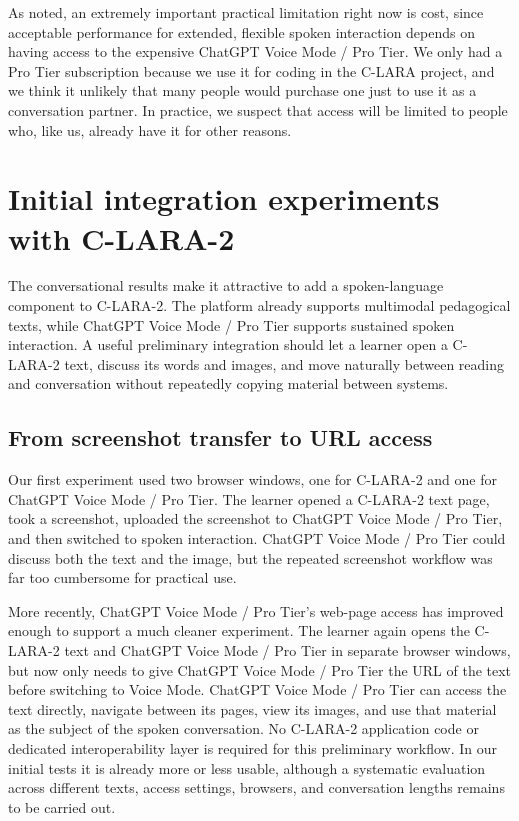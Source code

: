 \documentclass[11pt,a4paper]{article}
\begin{document}
As noted, an extremely important practical limitation right now is cost, since acceptable performance for extended, flexible spoken interaction depends on having access to the expensive ChatGPT Voice Mode / Pro Tier. We only had a Pro Tier subscription because we use it for coding in the C-LARA project, and we think it unlikely that many people would purchase one just to use it as a conversation partner. In practice, we suspect that access will be limited to people who, like us, already have it for other reasons.

\section{Initial integration experiments with C-LARA-2}

The conversational results make it attractive to add a spoken-language component to C-LARA-2. The platform already supports multimodal pedagogical texts, while ChatGPT Voice Mode / Pro Tier supports sustained spoken interaction. A useful preliminary integration should let a learner open a C-LARA-2 text, discuss its words and images, and move naturally between reading and conversation without repeatedly copying material between systems.

\subsection{From screenshot transfer to URL access}

Our first experiment used two browser windows, one for C-LARA-2 and one for ChatGPT Voice Mode / Pro Tier. The learner opened a C-LARA-2 text page, took a screenshot, uploaded the screenshot to ChatGPT Voice Mode / Pro Tier, and then switched to spoken interaction. ChatGPT Voice Mode / Pro Tier could discuss both the text and the image, but the repeated screenshot workflow was far too cumbersome for practical use.

More recently, ChatGPT Voice Mode / Pro Tier's web-page access has improved enough to support a much cleaner experiment. The learner again opens the C-LARA-2 text and ChatGPT Voice Mode / Pro Tier in separate browser windows, but now only needs to give ChatGPT Voice Mode / Pro Tier the URL of the text before switching to Voice Mode. ChatGPT Voice Mode / Pro Tier can access the text directly, navigate between its pages, view its images, and use that material as the subject of the spoken conversation. No C-LARA-2 application code or dedicated interoperability layer is required for this preliminary workflow. In our initial tests it is already more or less usable, although a systematic evaluation across different texts, access settings, browsers, and conversation lengths remains to be carried out.
\end{document}
